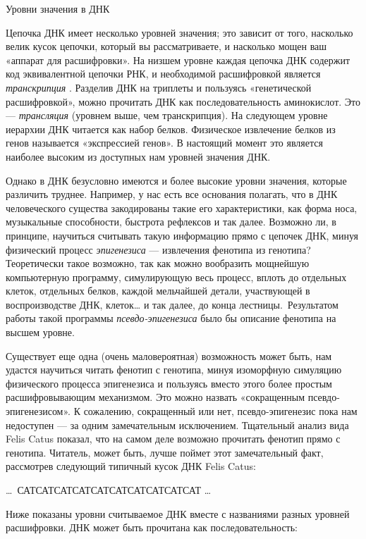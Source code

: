 Уровни значения в ДНК

Цепочка ДНК имеет несколько уровней значения; это зависит от того, насколько велик кусок цепочки, который вы рассматриваете, и насколько мощен ваш «аппарат для расшифровки». На низшем уровне каждая цепочка ДНК содержит код эквивалентной цепочки РНК, и необходимой расшифровкой является \emph{транскрипция} . Разделив ДНК на триплеты и пользуясь «генетической расшифровкой», можно прочитать ДНК как последовательность аминокислот. Это --- \emph{трансляция} (уровнем выше, чем транскрипция). На следующем уровне иерархии ДНК читается как набор белков. Физическое извлечение белков из генов называется «экспрессией генов». В настоящий момент это является наиболее высоким из доступных нам уровней значения ДНК.

Однако в ДНК безусловно имеются и более высокие уровни значения, которые различить труднее. Например, у нас есть все основания полагать, что в ДНК человеческого существа закодированы такие его характеристики, как форма носа, музыкальные способности, быстрота рефлексов и так далее. Возможно ли, в принципе, научиться считывать такую информацию прямо с цепочек ДНК, минуя физический процесс \emph{эпигенезиса} --- извлечения фенотипа из генотипа? Теоретически такое возможно, так как можно вообразить мощнейшую компьютерную программу, симулирующую весь процесс, вплоть до отдельных клеток, отдельных белков, каждой мельчайшей детали, участвующей в воспроизводстве ДНК, клеток\ldots{} и так далее, до конца лестницы.~Результатом работы такой программы \emph{псевдо-эпигенезиса} было бы описание фенотипа на высшем уровне.

Существует еще одна (очень маловероятная) возможность может быть, нам удастся научиться читать фенотип с генотипа, минуя изоморфную симуляцию физического процесса эпигенезиса и пользуясь вместо этого более простым расшифровывающим механизмом. Это можно назвать «сокращенным псевдо-эпигенезисом». К сожалению, сокращенный или нет, псевдо-эпигенезис пока нам недоступен --- за одним замечательным исключением. Тщательный анализ вида Felis Catus показал, что на самом деле возможно прочитать фенотип прямо с генотипа. Читатель, может быть, лучше поймет этот замечательный факт, рассмотрев следующий типичный кусок ДНК Felis Catus:

\ldots~САТСАТСАТСАТСАТСАТСАТСАТСАТСАТ \ldots{}

Ниже показаны уровни считываемое ДНК вместе с названиями разных уровней расшифровки. ДНК может быть прочитана как последовательность:


